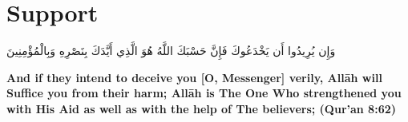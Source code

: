 \chapter{Support}
\begin{center}
    {\Huge    
        \begin{Arabic}
            وَإِن يُرِيدُوا أَن يَخْدَعُوكَ فَإِنَّ حَسْبَكَ اللَّهُ هُوَ الَّذِي أَيَّدَكَ بِنَصْرِهِ وَبِالْمُؤْمِنِينَ
        \end{Arabic}
    }    
\end{center}
\vspace*{\fill}
\vspace{3cm}
\begin{center}
    \large \textbf{And if they intend to deceive you [O, Messenger] verily, Allāh will Suffice you from their harm; Allāh is The One Who strengthened you with His Aid as well as with the help of The believers; (Qur'an 8:62)}
\end{center}
